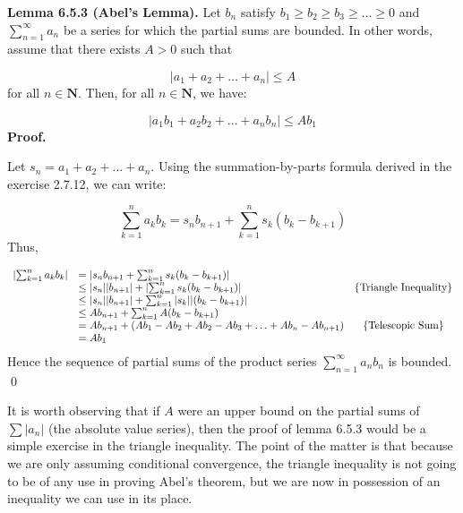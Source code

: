 \documentclass[10pt]{article}
\begin{document}
\textbf{Lemma 6.5.3 (Abel's Lemma).} Let $\displaystyle b_{n}$ satisfy $\displaystyle b_{1} \geq b_{2} \geq b_{3} \geq \dotsc \geq 0$ and $\displaystyle \sum _{n=1}^{\infty } a_{n}$ be a series for which the partial sums are bounded. In other words, assume that there exists $\displaystyle A >0$ such that 


\begin{equation*}
|a_{1} +a_{2} +\dotsc +a_{n} |\leq A
\end{equation*}
for all $\displaystyle n\in \mathbf{N}$. Then, for all $\displaystyle n\in \mathbf{N}$, we have:


\begin{equation*}
|a_{1} b_{1} +a_{2} b_{2} +\dotsc +a_{n} b_{n} |\leq Ab_{1}
\end{equation*}
\textbf{Proof.}



Let $\displaystyle s_{n} =a_{1} +a_{2} +\dotsc +a_{n}$. Using the summation-by-parts formula derived in the exercise 2.7.12, we can write:


\begin{equation*}
\sum _{k=1}^{n} a_{k} b_{k} =s_{n} b_{n+1} +\sum _{k=1}^{n} s_{k}( b_{k} -b_{k+1})
\end{equation*}
Thus,




\begin{equation*}
\begin{array}{ c l c }
\left| \sum _{k=1}^{n} a_{k} b_{k}\right|  & =\left| s_{n} b_{n+1} +\sum _{k=1}^{n} s_{k}( b_{k} -b_{k+1})\right|  & \\
 & \leq | s_{n}| |b_{n+1} |+\left| \sum _{k=1}^{n} s_{k}( b_{k} -b_{k+1})\right|  & \left\{\text{Triangle Inequality}\right\}\\
 & \leq | s_{n}| |b_{n+1} |+\sum _{k=1}^{n} |s_{k} ||( b_{k} -b_{k+1}) | & \\
 & \leq Ab_{n+1} +\sum _{k=1}^{n} A( b_{k} -b_{k+1}) & \\
 & =Ab_{n+1} +( Ab_{1} -Ab_{2} +Ab_{2} -Ab_{3} +\dotsc +Ab_{n} -Ab_{n+1}) & \left\{\text{Telescopic Sum}\right\}\\
 & =Ab_{1} & 
\end{array}
\end{equation*}
Hence the sequence of partial sums of the product series $\displaystyle \sum _{n=1}^{\infty } a_{n} b_{n}$ is bounded. \qed 

It is worth observing that if $\displaystyle A$ were an upper bound on the partial sums of $\displaystyle \sum |a_{n} |$ (the absolute value series), then the proof of lemma 6.5.3 would be a simple exercise in the triangle inequality. The point of the matter is that because we are only assuming conditional convergence, the triangle inequality is not going to be of any use in proving Abel's theorem, but we are now in possession of an inequality we can use in its place. 
\end{document}
